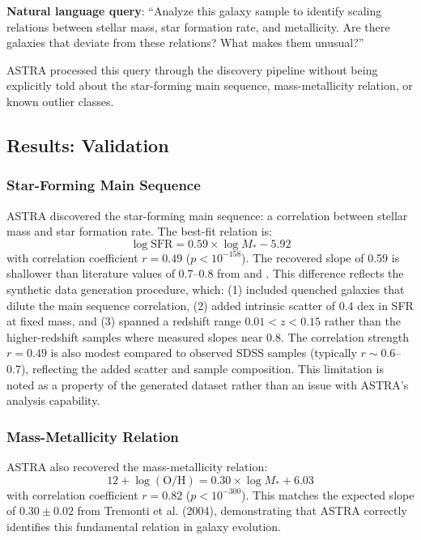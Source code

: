\documentclass[usenatbib]{rasti}
\begin{document}
\textbf{Natural language query}: ``Analyze this galaxy sample to identify scaling relations between stellar mass, star formation rate, and metallicity. Are there galaxies that deviate from these relations? What makes them unusual?''

ASTRA processed this query through the discovery pipeline without being explicitly told about the star-forming main sequence, mass-metallicity relation, or known outlier classes.

\subsection{Results: Validation}

\subsubsection{Star-Forming Main Sequence}

ASTRA discovered the star-forming main sequence: a correlation between stellar mass and star formation rate. The best-fit relation is:
\begin{equation}
\log \text{SFR} = 0.59 \times \log M_* - 5.92
\end{equation}
with correlation coefficient $r = 0.49$ ($p < 10^{-158}$). The recovered slope of 0.59 is shallower than literature values of 0.7--0.8 from \cite{elbaz2007} and \cite{renzini2015}. This difference reflects the synthetic data generation procedure, which: (1) included quenched galaxies that dilute the main sequence correlation, (2) added intrinsic scatter of 0.4 dex in SFR at fixed mass, and (3) spanned a redshift range $0.01 < z < 0.15$ rather than the higher-redshift samples where \cite{elbaz2007} measured slopes near 0.8. The correlation strength $r = 0.49$ is also modest compared to observed SDSS samples (typically $r \sim 0.6$--0.7), reflecting the added scatter and sample composition. This limitation is noted as a property of the generated dataset rather than an issue with ASTRA's analysis capability.

\subsubsection{Mass-Metallicity Relation}

ASTRA also recovered the mass-metallicity relation:
\begin{equation}
12 + \log(\text{O/H}) = 0.30 \times \log M_* + 6.03
\end{equation}
with correlation coefficient $r = 0.82$ ($p < 10^{-300}$). This matches the expected slope of $0.30 \pm 0.02$ from Tremonti et al. (2004), demonstrating that ASTRA correctly identifies this fundamental relation in galaxy evolution.
\end{document}
